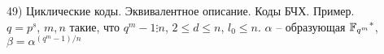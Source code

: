 49) Циклические коды. Эквивалентное описание. Коды БЧХ. Пример.\\

$q = p^s$, $m, n$ такие, что $q^m-1 \vdots n$, $2 \le d \le n$, $l_0 \le n$. $\alpha$ -- образующая ${\mathbb{F}_{q^m}}^*$, $\beta=\alpha^{(q^m-1)/n}$\\
